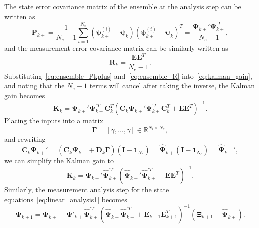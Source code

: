 The state error covariance matrix of the ensemble at the analysis step can be written as
\begin{equation}
\label{eq:ensemble_Pkplus}
\mathbf{P}_{k+} = \frac{1}{N_e-1} \sum_{i=1}^{N_e} ( \boldsymbol{\psi}_{k+}^{(i)} - \boldsymbol{\psi}_k)( \boldsymbol{\psi}_{k+}^{(i)} - \boldsymbol{\psi}_k)^T = \frac{\boldsymbol{\Psi}_{k+}'\boldsymbol{\Psi}_{k+}^{\prime T}}{N_e-1},
\end{equation}
and the measurement error covariance matrix can be similarly written as
\begin{equation}
\label{eq:ensemble_R}
\mathbf{R}_k = \frac{\mathbf{E}\mathbf{E}^T}{N_e-1}.
\end{equation}
Substituting~\eqref{eq:ensemble_Pkplus} and~\eqref{eq:ensemble_R} into~\eqref{eq:kalman_gain}, and noting that the $N_e-1$ terms will cancel after taking the inverse, the Kalman gain becomes
\begin{equation}
\mathbf{K}_k = \boldsymbol{\Psi}_{k+}'\boldsymbol{\Psi}_{k+}^{\prime T} \mathbf{C}_k^T\left( \mathbf{C}_k \boldsymbol{\Psi}_{k+}'\boldsymbol{\Psi}_{k+}^{\prime T}\mathbf{C}_k^T + \mathbf{E}\mathbf{E}^T\right)^{-1}.
\end{equation}
Placing the inputs into a matrix
\begin{equation}
\mathbf{\Gamma} = \left[ \gamma, \hdots, \gamma\right] \in \mathbb{R}^{N_i \times N_e},
\end{equation}
and rewriting
\begin{equation}
\mathbf{C}_k \boldsymbol{\Psi}_{k+}' = (\mathbf{C}_k \boldsymbol{\Psi}_{k+} + \mathbf{D}_k \boldsymbol{\Gamma}) (\mathbf{I} - \mathbf{1}_{N_e} ) = \hat{\boldsymbol{\Psi}}_{k+}(\mathbf{I} - \mathbf{1}_{N_e} )  = \hat{\boldsymbol{\Psi}}_{k+}',
\end{equation}
we can simplify the Kalman gain to
\begin{equation}
\mathbf{K}_k = \boldsymbol{\Psi}_{k+}'\hat{\boldsymbol{\Psi}}_{k+}^{\prime T}\left( \hat{\boldsymbol{\Psi}}_{k+}' \hat{\boldsymbol{\Psi}}_{k+}^{\prime T} + \mathbf{E}\mathbf{E}^T\right)^{-1}.
\end{equation}
Similarly, the measurement analysis step for the state equations~\eqref{eq:linear_analysis1} becomes
\begin{equation}
\label{eq:enkf_final}
\boldsymbol \Psi _{k+1} = \boldsymbol \Psi _{k+} + \boldsymbol \Psi '_{k+} \hat{\boldsymbol \Psi }^{\prime T}_{k+} \left(\hat{\boldsymbol \Psi }^{\prime}_{k+} \hat{\boldsymbol \Psi }^{\prime T}_{k+} +  \mathbf{E}_{k+1} \mathbf{E}_{k+1}^T\right)^{-1}\left( \boldsymbol \Xi_{k+1} - \hat{\boldsymbol \Psi }_{k+} \right).
\end{equation}

